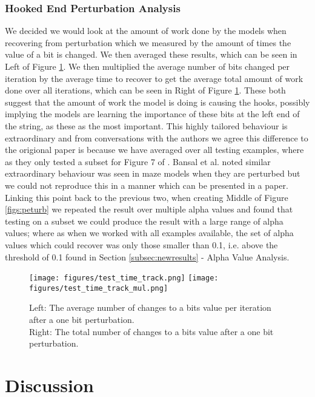 \subsubsection{Hooked End Perturbation Analysis}

We decided we would look at the amount of work done by the models when recovering from perturbation which we measured by the amount of times the value of a bit is changed. We then averaged these results, which can be seen in Left of Figure \ref{figs:hooks}. We then multiplied the average number of bits changed per iteration by the average time to recover to get the average total amount of work done over all iterations, which can be seen in Right of Figure \ref{figs:hooks}. These both suggest that the amount of work the model is doing is  causing the hooks, possibly implying the models are learning the importance of these bits at the left end of the string, as these as the most important. This highly tailored behaviour is extraordinary and from conversations with the authors we agree this difference to the origional paper is because we have averaged over all testing examples, where as they only tested a subset for Figure 7 of \cite{bansal2022endtoend}. Bansal et al. noted similar extraordinary behaviour was seen in maze models when they are perturbed but we could not reproduce this in a manner which can be presented in a paper. Linking this point back to the previous two, when creating Middle of Figure \ref{figs:peturb} we repeated the result over multiple alpha values and found that testing on a subset we could produce the result with a large range of alpha values; where as when we worked with all examples available, the set of alpha values which could recover was only those smaller than 0.1, i.e. above the threshold of 0.1  found in Section \ref{subsec:newresults} - Alpha Value Analysis.

\begin{figure}[h]
    \texttt{[image: figures/test\_time\_track.png]}\hfill
    \texttt{[image: figures/test\_time\_track\_mul.png]}
    \\[\smallskipamount]
    \caption{
    Left: The average number of changes to a bits value per iteration after a one bit perturbation.\\
    Right: The total number of changes to a bits value after a one bit perturbation.}
    \label{figs:hooks}
\end{figure}

\section{Discussion}

